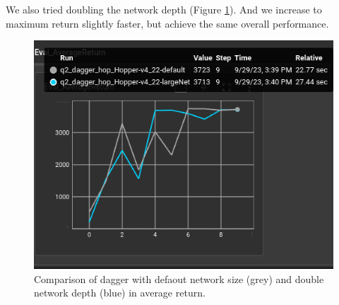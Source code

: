 \documentclass[11pt]{article}
\begin{document}
We also tried doubling the network depth (Figure \ref{fig:hop_dag2}). And we increase to maximum return slightly faster, but achieve the same overall performance.

\begin{figure}[h] 
    \centering
    \includegraphics[width=0.55 \linewidth]{09-29-dag_hop_all}
    \caption{Comparison of dagger with defaout network size (grey) and double network depth (blue) in average return.}
    \label{fig:hop_dag2}
\end{figure}
\end{document}
